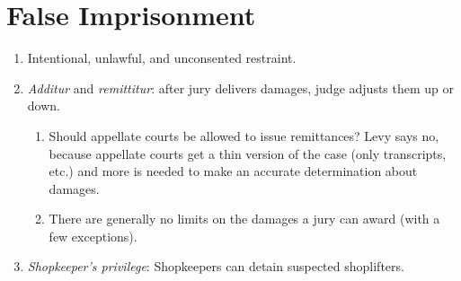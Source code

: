 \section{False Imprisonment}

\begin{enumerate}
    \item Intentional, unlawful, and unconsented restraint.
    \item \emph{Additur} and \emph{remittitur}: after jury delivers damages, judge adjusts them up or down.
    \begin{enumerate}
        \item Should appellate courts be allowed to issue remittances? Levy says no, because appellate courts get a thin version of the case (only transcripts, etc.) and more is needed to make an accurate determination about damages.
        \item There are generally no limits on the damages a jury can award (with a few exceptions).
    \end{enumerate}
    \item \emph{Shopkeeper's privilege}: Shopkeepers can detain suspected shoplifters.
\end{enumerate}

